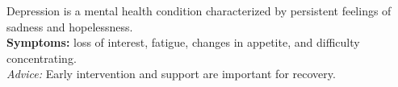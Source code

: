 Depression is a mental health condition characterized by persistent feelings of sadness and hopelessness.\\
\textbf{Symptoms:} loss of interest, fatigue, changes in appetite, and difficulty concentrating.\\
\textit{Advice:} Early intervention and support are important for recovery.\\ 